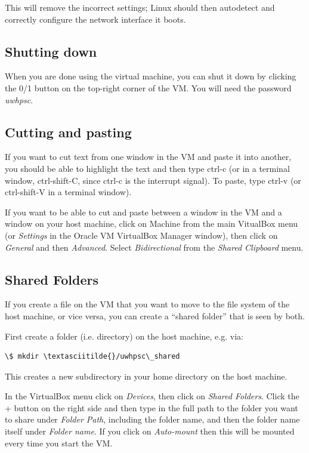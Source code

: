 \documentclass[letterpaper,10pt,english]{sphinxmanual}
\begin{document}
This will remove the incorrect settings; Linux should then autodetect
and correctly configure the network interface it boots.


\subsection{Shutting down}
\label{vm:shutting-down}
When you are done using the virtual machine, you can shut it down by
clicking the 0/1 button on the top-right corner of the VM.
You will need the password \emph{uwhpsc}.


\subsection{Cutting and pasting}
\label{vm:cutting-and-pasting}
If you want to cut text from one window in the VM and paste it into another,
you should be able to highlight the text and then type ctrl-c (or in a
terminal window, ctrl-shift-C, since ctrl-c is the interrupt signal). To
paste, type ctrl-v (or ctrl-shift-V in a terminal window).

If you want to be able to cut and paste between a window in the VM and a
window on your host machine, click on Machine from the main VitualBox menu
(or \emph{Settings} in the Oracle VM VirtualBox Manager window), then click on
\emph{General} and then \emph{Advanced}.  Select \emph{Bidirectional} from the \emph{Shared
Clipboard} menu.


\subsection{Shared Folders}
\label{vm:shared-folders}
If you create a file on the VM that you want to move to the file system of
the host machine, or vice versa, you can create a ``shared folder'' that is
seen by both.

First create a folder (i.e. directory) on the host machine, e.g. via:

\begin{Verbatim}[commandchars=\\\{\}]
\$ mkdir \textasciitilde{}/uwhpsc\_shared
\end{Verbatim}

This creates a new subdirectory in your home directory on the host machine.

In the VirtualBox menu click on \emph{Devices}, then click on
\emph{Shared Folders}.  Click the + button on the right side and then type in the
full path to the folder you want to share under \emph{Folder Path}, including the
folder name, and then the folder name itself under \emph{Folder name}.
If you click on \emph{Auto-mount} then this will be mounted every time you start
the VM.
\end{document}
